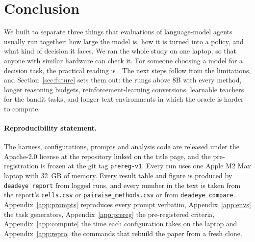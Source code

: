 \section{Conclusion}
\label{sec:conclusion}

We built \deadeye{} to separate three things that evaluations of language-model agents usually run together: how large the model is, how it is turned into a policy, and what kind of decision it faces. We ran the whole study on one laptop, so that anyone with similar hardware can check it.  For someone choosing a model for a decision task, the practical reading is . The next steps follow from the limitations, and Section~\ref{sec:future} sets them out: the rungs above 8B with every method, longer reasoning budgets, reinforcement-learning conversions, learnable teachers for the bandit tasks, and longer text environments in which the oracle is harder to compute.

\paragraph{Reproducibility statement.}
The harness, configurations, prompts and analysis code are released under the Apache-2.0 license at the repository linked on the title page, and the pre-registration is frozen at the git tag \texttt{prereg-v1}. Every run uses one Apple M2 Max laptop with 32~GB of memory. Every result table and figure is produced by \texttt{deadeye report} from logged runs, and every number in the text is taken from the report's \texttt{cells.csv} or \texttt{pairwise\_methods.csv} or from \texttt{deadeye compare}. Appendix~\ref{app:prompts} reproduces every prompt verbatim, Appendix~\ref{app:envs} the task generators, Appendix~\ref{app:prereg} the pre-registered criteria, Appendix~\ref{app:compute} the time each configuration takes on the laptop and Appendix~\ref{app:repro} the commands that rebuild the paper from a fresh clone. 
